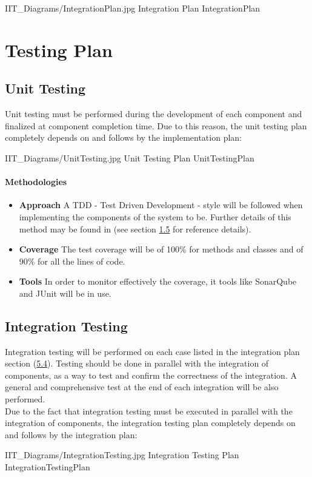 \documentclass[../DD.tex]{subfiles}
\begin{document}
\image {13cm} {IIT_Diagrams/IntegrationPlan.jpg} {Integration Plan} {IntegrationPlan}
\newpage
\section{Testing Plan}
\subsection{Unit Testing}
Unit testing must be performed during the development of each component and finalized at component completion time. Due to this reason, the unit testing plan completely depends on and follows by the implementation plan:

\image {13cm} {IIT_Diagrams/UnitTesting.jpg} {Unit Testing Plan} {UnitTestingPlan}

\paragraph{Methodologies}
\begin{itemize}
	\item\textbf{Approach} A TDD - Test Driven Development - style will be followed when implementing the components of the system to be. Further details of this method may be found in  (see section \hyperref[sect:1.5]{1.5} for reference details).
	\item\textbf{Coverage} The test coverage will be of 100\% for methods and classes and of 90\% for all the lines of code.
	\item\textbf{Tools} In order to monitor effectively the coverage, it tools like SonarQube and JUnit will be in use.
\end{itemize} 

\subsection{Integration Testing} Integration testing will be performed on each case listed in the integration plan section (\hyperref[sect:5.4]{5.4}). Testing should be done in parallel with the integration of components, as a way to test and confirm the correctness of the integration. A general and comprehensive test at the end of each integration will be also performed. \\
Due to the fact that integration testing must be executed in parallel with the integration of components, the integration testing plan completely depends on and follows by the integration plan:

\image {13cm} {IIT_Diagrams/IntegrationTesting.jpg} {Integration Testing Plan} {IntegrationTestingPlan}

\thispagestyle{fancy}
\end{document}
